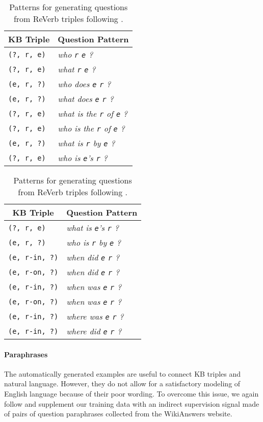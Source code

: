 \documentclass[runningheads,a4paper]{llncs}
\newcommand{\kb}[1]{{\small\texttt{#1}}\xspace}
\newcommand{\rv}{{\sc ReVerb}\xspace}
\newcommand{\wk}{{\sc WikiAnswers}\xspace}
\begin{document}
\begin{table}[t]
\caption{Patterns for generating questions from \rv triples following \cite{paralex}.}
\label{tab:qpat}
\vskip -0.1in
\begin{center}
\begin{small}
\begin{tabular}{|l|l|}
\hline
\multicolumn{1}{|c|}{{\bf KB Triple}}  & \multicolumn{1}{c|}{{\bf Question Pattern}}\\
\hline
\kb{(?, r, e)} & {\it who \kb{r} \kb{e} ?}\\
\kb{(?, r, e)} & {\it what \kb{r} \kb{e} ?}\\
\kb{(e, r, ?)} & {\it who does \kb{e} \kb{r} ?}\\
\kb{(e, r, ?)} & {\it what does \kb{e} \kb{r} ?}\\
\kb{(?, r, e)} & {\it what is the \kb{r} of \kb{e} ?}\\
\kb{(?, r, e)} & {\it who is the \kb{r} of \kb{e} ?}\\
\kb{(e, r, ?)} & {\it what is \kb{r} by \kb{e} ?}\\
\kb{(?, r, e)} & {\it who is \kb{e}'s \kb{r} ?}\\
\hline
\end{tabular}
\begin{tabular}{|l|l|}
\hline
\multicolumn{1}{|c|}{{\bf KB Triple}}  & \multicolumn{1}{c|}{{\bf Question Pattern}}\\
\hline
\kb{(?, r, e)} & {\it what is \kb{e}'s \kb{r} ?}\\
\kb{(e, r, ?)} & {\it who is \kb{r} by \kb{e} ?}\\
\kb{(e, r-in, ?)} & {\it when did \kb{e} \kb{r} ?}\\
\kb{(e, r-on, ?)} & {\it when did \kb{e} \kb{r} ?}\\
\kb{(e, r-in, ?)} & {\it when was \kb{e} \kb{r} ?}\\
\kb{(e, r-on, ?)} & {\it when was \kb{e} \kb{r} ?}\\
\kb{(e, r-in, ?)} & {\it where was \kb{e} \kb{r} ?}\\
\kb{(e, r-in, ?)} & {\it where did \kb{e} \kb{r} ?}\\
\hline
\end{tabular}


\end{small}
\end{center}
\vskip -0.1in
\end{table}

\paragraph{Paraphrases}
The automatically generated examples are useful to connect KB triples and natural language.
However, they do not allow for a satisfactory modeling of English language because of their poor wording.
To overcome this issue, we again follow \cite{paralex} and supplement our training data with an indirect supervision signal made of pairs of question paraphrases collected from the \wk website.
\end{document}

